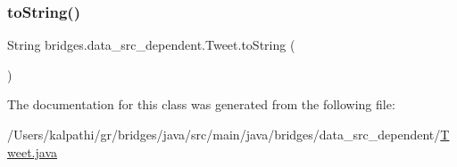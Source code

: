 \mbox{\label{classbridges_1_1data__src__dependent_1_1_tweet_adfba67504a7463a7f16aff46d2bb893f}} 
\subsubsection{\texorpdfstring{toString()}{toString()}}
{\footnotesize\ttfamily String bridges.\+data\+\_\+src\+\_\+dependent.\+Tweet.\+to\+String (\begin{DoxyParamCaption}{ }\end{DoxyParamCaption})}



The documentation for this class was generated from the following file\+:\begin{DoxyCompactItemize}
\item 
/\+Users/kalpathi/gr/bridges/java/src/main/java/bridges/data\+\_\+src\+\_\+dependent/\mbox{\hyperlink{_tweet_8java}{Tweet.\+java}}\end{DoxyCompactItemize}
